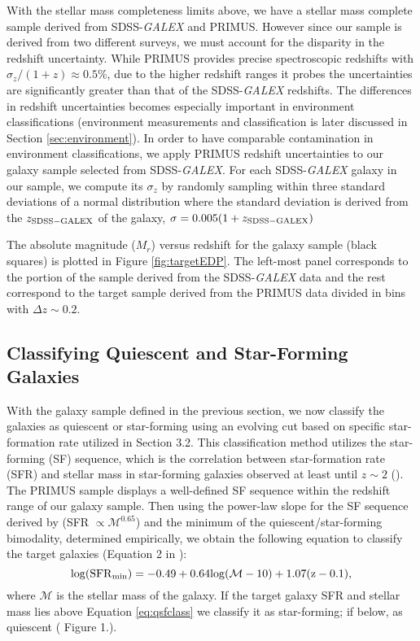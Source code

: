 \documentclass{emulateapj}
\begin{document}
With the stellar mass completeness limits above, we have a stellar mass complete sample derived from SDSS-{\em GALEX} and PRIMUS. However since our sample is derived from two different surveys, we must account for the disparity in the redshift uncertainty. While PRIMUS provides precise spectroscopic redshifts with $\sigma_{z}/(1+z) \approx 0.5 \%$, due to the higher redshift ranges it probes the uncertainties are significantly greater than that of the SDSS-{\em GALEX} redshifts. The differences in redshift uncertainties becomes especially important in environment classifications (environment measurements and classification is later discussed in Section \ref{sec:environment}). In order to have comparable contamination in environment classifications, we apply PRIMUS redshift uncertainties to our galaxy sample selected from SDSS-{\em GALEX}. For each SDSS-{\em GALEX} galaxy in our sample, we compute its $\sigma_z$ by randomly sampling within three standard deviations of a normal distribution where the standard deviation is derived from the $z_{\rm{SDSS}-GALEX}$ of the galaxy, $\sigma = 0.005 (1+z_{\rm{SDSS}- GALEX})$

The absolute magnitude ($M_{r}$) versus redshift for the galaxy sample (black squares) is plotted in Figure \ref{fig:targetEDP}. The left-most panel corresponds to the portion of the sample derived from the SDSS-{\em GALEX} data and the rest correspond to the target sample derived from the PRIMUS data divided in bins with $\Delta z \sim 0.2$. 

\subsection{Classifying Quiescent and Star-Forming Galaxies} \label{sec:sfq}
With the galaxy sample defined in the previous section, we now classify the galaxies as quiescent or star-forming using an evolving cut based on specific star-formation rate utilized in \cite{Moustakas:2013aa} Section 3.2. This classification method utilizes the star-forming (SF) sequence, which is the correlation between star-formation rate (SFR) and stellar mass in star-forming galaxies observed at least until $z \sim 2$ (\cite{Noeske:2007aa}). The PRIMUS sample displays a well-defined SF sequence within the redshift range of our galaxy sample. Then using the power-law slope for the SF sequence derived by \cite{Salim:2007aa} (SFR $\propto \mathcal{M}^{0.65}$) and the minimum of the quiescent/star-forming bimodality, determined empirically, we obtain the following equation to classify the target galaxies (Equation 2 in \cite{Moustakas:2013aa}):
\begin{equation}
\rm{log}(\rm{SFR}_{\rm{min}}) = -0.49 + 0.64 \rm{log}(\mathcal{M} - 10) +1.07(z-0.1), 
\end{equation} \label{eq:qsfclass} 
where $\mathcal{M}$ is the stellar mass of the galaxy. If the target galaxy SFR and stellar mass lies above Equation \ref{eq:qsfclass} we classify it as star-forming; if below, as quiescent (\cite{Moustakas:2013aa} Figure 1.).
\end{document}
